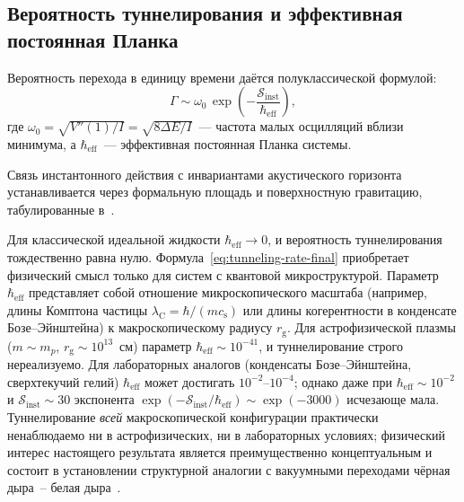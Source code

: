 \documentclass[12pt,a4paper,preprint]{elsarticle}
\begin{document}
        \subsection{Вероятность туннелирования и эффективная постоянная Планка}\label{subsec:tunneling-probability}
            Вероятность перехода в единицу времени даётся полуклассической формулой:
            \begin{equation}
                \Gamma \sim \omega_{0}\,\exp\left(-\frac{\mathcal{S}_{\mathrm{inst}}}{\hbar_{\mathrm{eff}}}\right),
                \label{eq:tunneling-rate-final}
            \end{equation}
            где $\omega_{0} = \sqrt{V''(1)/I} = \sqrt{8\Delta E/I}$~--- частота малых осцилляций вблизи минимума, а $\hbar_{\mathrm{eff}}$~--- эффективная постоянная Планка системы.
            
            Связь инстантонного действия с инвариантами акустического горизонта устанавливается через формальную площадь и поверхностную гравитацию, табулированные в~\cite{SemyannikovAV_AcousticGeometryAndSoundRayDynamicsInRelativisticSphericalAccretion_2026}.
            
            Для классической идеальной жидкости $\hbar_{\mathrm{eff}} \to 0$, и вероятность туннелирования тождественно равна нулю. Формула~\eqref{eq:tunneling-rate-final} приобретает физический смысл только для систем с квантовой микроструктурой. Параметр $\hbar_{\mathrm{eff}}$ представляет собой отношение микроскопического масштаба (например, длины Комптона частицы $\lambda_{\mathrm{C}} = \hbar/(m c_{\mathrm{s}})$ или длины когерентности в конденсате Бозе--Эйнштейна) к макроскопическому радиусу $r_{\mathrm{g}}$. Для астрофизической плазмы ($m \sim m_{p}$, $r_{\mathrm{g}} \sim 10^{13}$~см) параметр $\hbar_{\mathrm{eff}} \sim 10^{-41}$, и туннелирование строго нереализуемо. Для лабораторных аналогов (конденсаты Бозе--Эйнштейна, сверхтекучий гелий) $\hbar_{\mathrm{eff}}$ может достигать $10^{-2}$--$10^{-4}$; однако даже при $\hbar_{\mathrm{eff}} \sim 10^{-2}$ и $\mathcal{S}_{\mathrm{inst}} \sim 30$ экспонента $\exp(-\mathcal{S}_{\mathrm{inst}}/\hbar_{\mathrm{eff}}) \sim \exp(-3000)$ исчезающе мала. Туннелирование \emph{всей} макроскопической конфигурации практически ненаблюдаемо ни в астрофизических, ни в лабораторных условиях; физический интерес настоящего результата является преимущественно концептуальным и состоит в установлении структурной аналогии с вакуумными переходами чёрная дыра~-- белая дыра~\cite{VolovikGE_PainleveGullstrandCoordinatesForSchwarzschildDeSitterSpacetime_2023}.
\end{document}
